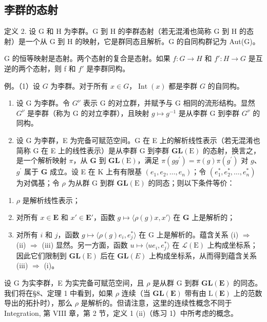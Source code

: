 \subsection{李群的态射}

定义 2. 设 G 和 H 为李群。G 到 H 的李群态射（若无混淆也简称 G 到 H 的态射）是一个从 G 到 H 的映射，它是群同态且解析。G 的自同构群记为 Aut(G)。

G 的恒等映射是态射。两个态射的复合是态射。如果 \(f: G \to H\) 和 \(f': H \to G\) 是互逆的两个态射，则 f 和 \(f'\) 是李群同构。

例。（1）设 \(G\) 为李群。对于所有 \(x \in G\)，\(\operatorname{Int}(x)\) 都是李群 \(G\) 的自同构。

\begin{enumerate}
\def\labelenumi{(\arabic{enumi})}
\setcounter{enumi}{1}
\item
  设 G 为李群。令 \(G^{\nu}\) 表示 G 的对立群，并赋予与 G 相同的流形结构。显然 \(G^{\nu}\) 是李群（称为 G 的对立李群），且映射 \(g \mapsto g^{-1}\) 是从李群 G 到李群 \(G^{\nu}\) 的同构。
\item
  设 G 为李群，E 为完备可赋范空间。G 在 E 上的解析线性表示（若无混淆也简称 G 在 E 上的线性表示）是从李群 G 到李群 \(\mathbf{GL}(\mathrm{E})\) 的态射，换言之，是一个解析映射 \(\pi\)，从 \(\mathbf{G}\) 到 \(\mathbf{GL}(\mathrm{E})\)，满足 \(\pi (gg^{\prime}) = \pi (g)\pi (g^{\prime})\) 对 \(g\)、\(g^{\prime}\) 属于 \(\mathbf{G}\) 成立。设 E 在 K 上有有限基 \((e_1,e_2,\ldots ,e_n)\)；令 \((e_1^*,e_2^*,\dots ,e_n^*)\) 为对偶基；令 \(\rho\) 为从群 G 到群 \(\mathbf{GL}(\mathrm{E})\) 的同态；则以下条件等价：
\end{enumerate}

\begin{enumerate}
\def\labelenumi{(\roman{enumi})}
\item
  \(\rho\) 是解析线性表示；
\item
  对所有 \(x \in \mathbf{E}\) 和 \(x' \in \mathbf{E}'\)，函数 \(g \mapsto \langle \rho(g)x, x' \rangle\) 在 \(\mathbf{G}\) 上是解析的；
\item
  对所有 \(i\) 和 \(j\)，函数 \(g \mapsto \langle \rho(g)e_i, e_j^*\rangle\) 在 G 上是解析的。蕴含关系 (i) \(\Rightarrow\) (ii) \(\Rightarrow\) (iii) 显然。另一方面，函数 \(u \mapsto \langle ue_i, e_j^*\rangle\) 在 \(\mathcal{L}(\mathrm{E})\) 上构成坐标系；因此它们限制到 \(\mathbf{GL}(\mathrm{E})\) 后在 \(\mathbf{GL}(E)\) 上构成坐标系，从而得到蕴含关系 (iii) \(\Rightarrow\) (i)。
\end{enumerate}

设 G 为实李群，E 为实完备可赋范空间，且 \(\rho\) 是从群 G 到群 \(\mathbf{GL}(\mathbf{E})\) 的同态。我们将在§8、定理 1 中看到，如果 \(\rho\) 连续（当 \(\mathbf{GL}(\mathbf{E})\) 带有由 \(\mathrm{L}(\mathbf{E})\) 上的范数导出的拓扑时），那么 \(\rho\) 是解析的。但请注意，这里的连续性概念不同于 Integration, 第 VIII 章，第 2 节，定义 1 (ii)（练习 1）中所考虑的概念。


